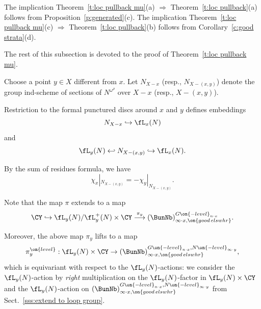 \documentclass[9pt]{amsart}
\theoremstyle{definition}
\theoremstyle{remark}
\newcommand{\thmref}[1]{Theorem~\ref{#1}}
\newcommand{\secref}[1]{Sect.~\ref{#1}}
\newcommand{\propref}[1]{Proposition~\ref{#1}}
\newcommand{\corref}[1]{Corollary~\ref{#1}}
\numberwithin{equation}{section}
\begin{document}
The implication \thmref{t:loc pullback mu}(a) $\Rightarrow$ \thmref{t:loc pullback}(a) follows from
\propref{p:generated}(c). The implication \thmref{t:loc pullback mu}(c) $\Rightarrow$ \thmref{t:loc pullback}(b)
follows from \corref{c:good strata}(d). 

\medskip

The rest of this subsection is devoted to the proof of \thmref{t:loc pullback mu}.

\sssec{}

Choose a point $y\in X$ different from $x$. Let $N_{X-x}$ (resp., $N_{X-(x,y)}$) denote the group ind-scheme of sections of 
$N^{\omega^\rho}$ over $X-x$ (resp., $X-(x,y)$). 


\medskip

Restriction to the formal punctured discs around $x$ and $y$ defines embeddings
$$N_{X-x}\hookrightarrow \fL_x(N)$$
and
$$\fL_y(N) \hookleftarrow N_{X-(x,y)}\hookrightarrow \fL_x(N).$$

By the sum of residues formula, we have
$$\chi_x|_{N_{X-(x,y)}}=-\chi_y|_{N_{X-(x,y)}}.$$

\medskip

Note that the map $\pi$ extends to a map
$$\CY\hookrightarrow \fL_y(N)/\fL^+_y(N)\times \CY \overset{\pi_{y}} \longrightarrow
(\BunNb)^{G\on{-level}_{n\cdot x}}_{\infty\cdot x,\on{good\,elswhr}}.$$

Moreover, the above map $\pi_y$ lifts to a map 
$$\pi^{\on{level}}_y:
\fL_y(N) \times \CY \to (\BunNb)^{G\on{-level}_{n\cdot x},N\on{-level}_{\infty\cdot y}}_{\infty\cdot x,\on{good\,elswhr}},$$
which is equivariant with respect to the $\fL_y(N)$-actions: we consider the $\fL_y(N)$-action by \emph{right} multiplication on 
the $\fL_y(N)$-factor in $\fL_y(N) \times \CY$ and the $\fL_y(N)$-action on 
$(\BunNb)^{G\on{-level}_{n\cdot x},N\on{-level}_{\infty\cdot y}}_{\infty\cdot x,\on{good\,elswhr}}$ from \secref{sss:extend to loop group}.

\medskip
\end{document}

